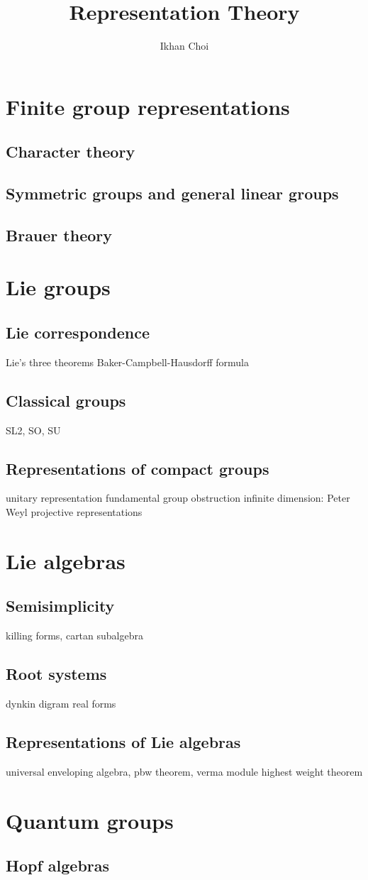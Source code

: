 \documentclass{../note}
\begin{document}
\title{Representation Theory}
\author{Ikhan Choi}
\maketitle
\tableofcontents

\part{Finite group representations}
\chapter{Character theory}
\chapter{Symmetric groups and general linear groups}
\chapter{Brauer theory}




\part{Lie groups}
\chapter{Lie correspondence}
Lie's three theorems
Baker-Campbell-Hausdorff formula
\chapter{Classical groups}
SL2, SO, SU
\chapter{Representations of compact groups}
unitary representation
fundamental group obstruction
infinite dimension: Peter Weyl
projective representations




\part{Lie algebras}
\chapter{Semisimplicity}
killing forms, cartan subalgebra
\chapter{Root systems}
dynkin digram
real forms
\chapter{Representations of Lie algebras}
universal enveloping algebra, pbw theorem, verma module
highest weight theorem



\part{Quantum groups}
\chapter{Hopf algebras}
\chapter{}
\end{document}
